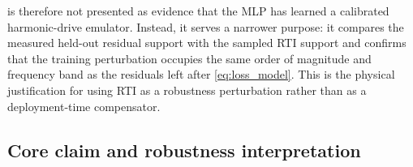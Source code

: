 \documentclass[twoside,final,1p,times]{elsarticle}
\newenvironment{revblock}{}{}
\begin{document}
\begin{revblock}
 is therefore not presented as evidence that the MLP has learned a calibrated harmonic-drive emulator. Instead, it serves a narrower purpose: it compares the measured held-out residual support with the sampled RTI support and confirms that the training perturbation occupies the same order of magnitude and frequency band as the residuals left after \cref{eq:loss_model}. This is the physical justification for using RTI as a robustness perturbation rather than as a deployment-time compensator.
\end{revblock}


\subsection{Core claim and robustness interpretation}
\label{subsec:robustness_interpretation}
\end{document}
